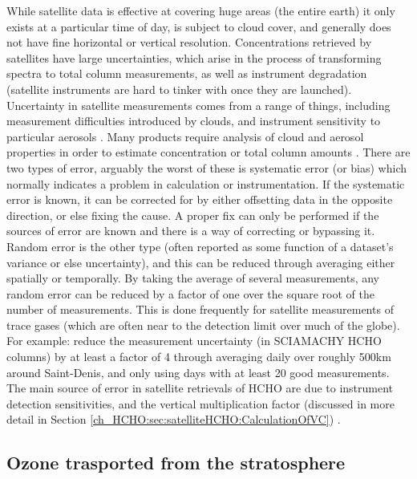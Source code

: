       While satellite data is effective at covering huge areas (the entire earth) it only exists at a particular time of day, is subject to cloud cover, and generally does not have fine horizontal or vertical resolution.
      Concentrations retrieved by satellites have large uncertainties, which arise in the process of transforming spectra to total column measurements, as well as instrument degradation (satellite instruments are hard to tinker with once they are launched).
      Uncertainty in satellite measurements comes from a range of things, including measurement difficulties introduced by clouds, and instrument sensitivity to particular aerosols \citep{Millet2006}.
      Many products require analysis of cloud and aerosol properties in order to estimate concentration or total column amounts \citep{Palmer2001,Palmer2003, Marais2012, Vasilkov2017}.
      There are two types of error, arguably the worst of these is systematic error (or bias) which normally indicates a problem in calculation or instrumentation.
      If the systematic error is known, it can be corrected for by either offsetting data in the opposite direction, or else fixing the cause.
      A proper fix can only be performed if the sources of error are known and there is a way of correcting or bypassing it.
      Random error is the other type (often reported as some function of a dataset's variance or else uncertainty), and this can be reduced through averaging either spatially or temporally. 
      By taking the average of several measurements, any random error can be reduced by a factor of one over the square root of the number of measurements.
      This is done frequently for satellite measurements of trace gases (which are often near to the detection limit over much of the globe).
      For example: \citet{Vigouroux2009} reduce the measurement uncertainty (in SCIAMACHY HCHO columns) by at least a factor of 4 through averaging daily over roughly 500km around Saint-Denis, and only using days with at least 20 good measurements.
      The main source of error in satellite retrievals of HCHO are due to instrument detection sensitivities, and the vertical multiplication factor (discussed in more detail in Section \ref{ch_HCHO:sec:satelliteHCHO:CalculationOfVC}) \citep{Millet2006}.
      
      
  \subsection{Ozone trasported from the stratosphere}
    
